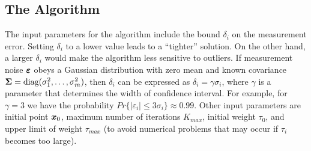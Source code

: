 \subsection{The Algorithm}

The input parameters for the algorithm include the bound $\delta_i$ on the measurement error.  Setting $\delta_i$  to a lower value leads to a ``tighter'' solution. On the other hand, a larger $\delta_i$ would make the algorithm less sensitive to outliers.  If measurement noise $\mbox{\boldmath${\varepsilon}$}$ obeys a Gaussian distribution with zero mean and known covariance $\mbox{\boldmath${\Sigma}$} = \mbox{diag}(\sigma_1^2, \ldots, \sigma_m^2)$, then $\delta_i$ can be expressed as $\delta_i = \gamma \sigma_i$, where $\gamma$ is a parameter that determines the width of  confidence interval. For example, for $\gamma = 3$ we have the probability $Pr\{|\varepsilon_i| \leq 3\sigma_i\} \approx 0.99$. Other input parameters are initial point $\mbox{\boldmath$x$}_0$, maximum number of iterations $K_{max}$, initial weight $\tau_0$, and upper limit of weight $\tau_{max}$ (to avoid numerical problems that may occur  if $\tau_i$ becomes too large).

